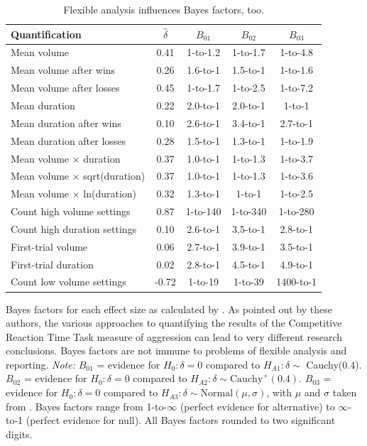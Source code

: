 \documentclass[man]{apa6}
\begin{document}
\begin{table}
\caption{Flexible analysis influences Bayes factors, too.}
\begin{center}
\begin{tabular}{lcccc}
Quantification&$\hat{\delta}$&$B_{01}$&$B_{02}$&$B_{03}$ \\ \hline
Mean volume&0.41&1-to-1.2&1-to-1.7&1-to-4.8 \\
Mean volume after wins&0.26&1.6-to-1&1.5-to-1&1-to-1.6 \\
Mean volume after losses &0.45&1-to-1.7&1-to-2.5&1-to-7.2 \\
Mean duration &0.22&2.0-to-1&2.0-to-1&1-to-1 \\
Mean duration after wins&0.10&2.6-to-1&3.4-to-1&2.7-to-1 \\
Mean duration after losses &0.28&1.5-to-1&1.3-to-1&1-to-1.9 \\
Mean volume $\times$ duration &0.37&1.0-to-1&1-to-1.3&1-to-3.7 \\
Mean volume $\times$ sqrt(duration)&0.37&1.0-to-1&1-to-1.3&1-to-3.6 \\
Mean volume $\times$ ln(duration) &0.32&1.3-to-1&1-to-1&1-to-2.5 \\ 
Count high volume settings &0.87&1-to-140&1-to-340&1-to-280 \\
Count high duration settings &0.10&2.6-to-1&3.5-to-1&2.8-to-1 \\
First-trial volume &0.06&2.7-to-1&3.9-to-1&3.5-to-1 \\ 
First-trial duration&0.02&2.8-to-1&4.5-to-1&4.9-to-1 \\
Count low volume settings&-0.72&1-to-19&1-to-39&1400-to-1 \\ \hline
\end{tabular}
\end{center}

\vspace{4mm}
Bayes factors for each effect size as calculated by \citet[study 2, table 2]{Elson:etal:2014}. As pointed out by these authors, the various approaches to quantifying the results of the Competitive Reaction Time Task measure of aggression can lead to very different research conclusions. Bayes factors are not immune to problems of flexible analysis and reporting. {\em Note:} $B_{01}$ = evidence for $H_0: \delta = 0$ compared to $H_{A1}: \delta \sim$ Cauchy(0.4). $B_{02}$ = evidence for $H_0: \delta = 0$ compared to $H_{A2}: \delta \sim \mbox{Cauchy}^{+}(0.4)$. $B_{03}$ = evidence for $H_0: \delta = 0$ compared to $H_{A3}: \delta \sim \mbox{Normal}(\mu, \sigma)$, with $\mu$ and $\sigma$ taken from \citet{Anderson:etal:2010}. Bayes factors range from 1-to-$\infty$ (perfect evidence for alternative) to $\infty$-to-1 (perfect evidence for null). All Bayes factors rounded to two significant digits.
\label{ElsonCRTTHacking}
\end{table}

\newpage


\end{document}
